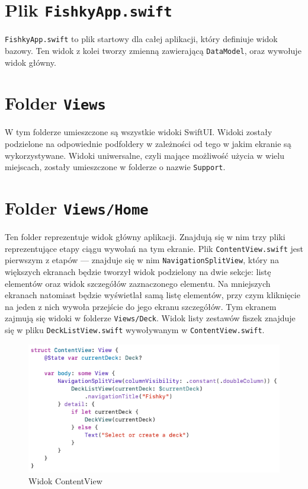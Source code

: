 \documentclass[final,a4paper,openany,12pt]{mwbk}
\begin{document}
\section{Plik \texttt{FishkyApp.swift}}

\texttt{FishkyApp.swift} to plik startowy dla całej aplikacji, który definiuje widok bazowy. Ten widok z kolei tworzy zmienną zawierającą \texttt{DataModel}, oraz wywołuje widok główny.

\section{Folder \texttt{Views}}

W tym folderze umieszczone są wszystkie widoki SwiftUI. Widoki zostały podzielone na odpowiednie podfoldery w zależności od tego w jakim ekranie są wykorzystywane. Widoki uniwersalne, czyli mające możliwość użycia w wielu miejscach, zostały umieszczone w folderze o nazwie \texttt{Support}.

\section{Folder \texttt{Views/Home}}

Ten folder reprezentuje widok główny aplikacji. Znajdują się w nim trzy pliki reprezentujące etapy ciągu wywołań na tym ekranie. Plik \texttt{ContentView.swift} jest pierwszym z etapów --- znajduje się w nim  \texttt{NavigationSplitView}, który na większych ekranach będzie tworzył widok podzielony na dwie sekcje: listę elementów oraz widok szczegółów zaznaczonego elementu. Na mniejszych ekranach natomiast będzie wyświetlał samą listę elementów, przy czym kliknięcie na jeden z nich wywoła przejście do jego ekranu szczegółów. Tym ekranem zajmują się widoki w folderze \texttt{Views/Deck}. Widok listy zestawów fiszek znajduje się w pliku \texttt{DeckListView.swift} wywoływanym w \texttt{ContentView.swift}.


\begin{figure}[H]
    \centering
    \includegraphics[width=0.7\linewidth]{img/home1.png}
    \caption{Widok ContentView}
    \label{fig:home1}
\end{figure}
\end{document}
